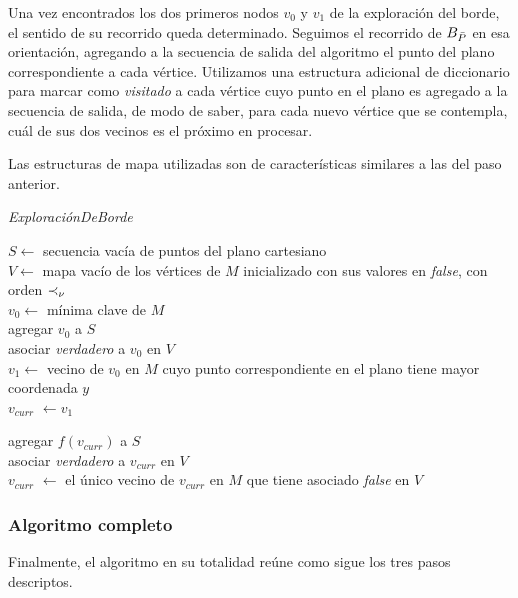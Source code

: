 Una vez encontrados los dos primeros nodos $v_0$ y $v_1$ de la exploración del borde, el sentido de su recorrido queda determinado. Seguimos el recorrido de $B_{\bar{P}}$ en esa orientación, agregando a la secuencia de salida del algoritmo el punto del plano correspondiente a cada vértice. Utilizamos una estructura adicional de diccionario para marcar como \textit{visitado} a cada vértice cuyo punto en el plano es agregado a la secuencia de salida, de modo de saber, para cada nuevo vértice que se contempla, cuál de sus dos vecinos es el próximo en procesar.

Las estructuras de mapa utilizadas son de características similares a las del paso anterior.

\bigskip

\begin{algorithm}[H]
	\caption{\textit{ExploraciónDeBorde}}

	$S \gets$ secuencia vacía de puntos del plano cartesiano \\
	$V \gets$ mapa vacío de los vértices de $M$ inicializado con sus valores en \textit{false}, con orden $\prec_{\nu}$ \\
	$v_0 \gets$ mínima clave de $M$ \\
	agregar $v_0$ a $S$ \\
	asociar \textit{verdadero} a $v_0$ en $V$ \\
	$v_1 \gets$ vecino de $v_0$ en $M$ cuyo punto correspondiente en el plano tiene mayor coordenada $y$ \\
	$v_{\mathit{curr}}$ $\gets v_1$
	
	  {
		agregar $f(\mathit{v_{\mathit{curr}}})$ a $S$ \\
    		asociar \textit{verdadero} a $v_{\mathit{curr}}$ en $V$ \\
		$v_{\mathit{curr}}$ $\gets$ el único vecino de $v_{\mathit{curr}}$ en $M$ que tiene asociado \textit{false} en $V$ \\
	}

\end{algorithm}

\bigskip

\subsubsection{Algoritmo completo}

Finalmente, el algoritmo en su totalidad reúne como sigue los tres pasos descriptos.


